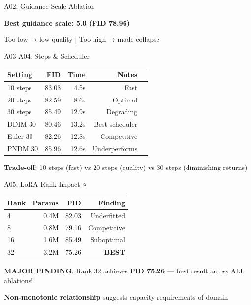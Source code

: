 \documentclass{beamer}
\begin{document}
\begin{frame}{A02: Guidance Scale Ablation}
\begin{center}
\end{center}

\vspace{0.3cm}
\textbf{Best guidance scale: 5.0 (FID 78.96)}

Too low → low quality | Too high → mode collapse
\end{frame}

\begin{frame}{A03-A04: Steps \& Scheduler}
\begin{table}
\centering
\begin{tabular}{lrrrr}
\toprule
Setting & FID & Time & Notes \\
\midrule
10 steps & 83.03 & 4.5s & Fast \\
20 steps & 82.59 & 8.6s & Optimal \\
30 steps & 85.49 & 12.9s & Degrading \\
\midrule
DDIM 30 & 80.46 & 13.2s & Best scheduler \\
Euler 30 & 82.26 & 12.8s & Competitive \\
PNDM 30 & 85.96 & 12.6s & Underperforms \\
\bottomrule
\end{tabular}
\end{table}

\textbf{Trade-off}: 10 steps (fast) vs 20 steps (quality) vs 30 steps (diminishing returns)
\end{frame}

\begin{frame}{A05: LoRA Rank Impact ⭐}
\begin{table}
\centering
\begin{tabular}{lrrr}
\toprule
Rank & Params & FID & Finding \\
\midrule
4 & 0.4M & 82.03 & Underfitted \\
8 & 0.8M & 79.16 & Competitive \\
16 & 1.6M & 85.49 & Suboptimal \\
32 & 3.2M & 75.26 & \textbf{BEST} \\
\bottomrule
\end{tabular}
\end{table}

\vspace{0.3cm}
\textbf{MAJOR FINDING}: Rank 32 achieves \textbf{FID 75.26} — best result across ALL ablations!

\textbf{Non-monotonic relationship} suggests capacity requirements of domain
\end{frame}
\end{document}
